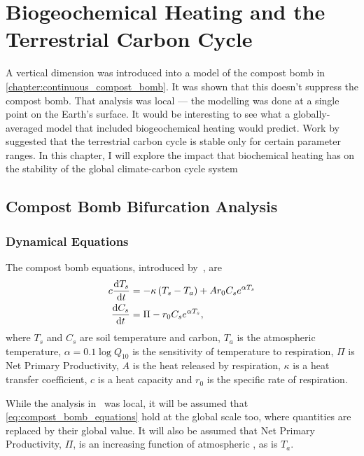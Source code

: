 \chapter{Biogeochemical Heating and the Terrestrial Carbon Cycle}
\label{chapter:global_bomb}
\graphicspath{{global_bomb/figs/}}

\lettrine[lines=3,loversize=0.1,findent=-0.9em,nindent=0.5em,slope=0.6em]{A}{} vertical dimension was introduced into a model of the compost
bomb in \cref{chapter:continuous_compost_bomb}. It was shown that this doesn't
suppress the compost bomb. That analysis was local ---  the modelling was done at a single point on the Earth's surface. It would be interesting to see
what a globally-averaged model that included biogeochemical heating would predict. Work by~\cite{Cox2006} suggested that the terrestrial carbon cycle is stable
only for certain parameter ranges. 
In this chapter, I will explore the impact that biochemical heating has on the stability of the global climate-carbon cycle system
\section{Compost Bomb Bifurcation Analysis}

\subsection{Dynamical Equations}
The compost bomb equations, introduced by~\cite{Luke2011}, are
\begin{subequations}
  \label{eq:compost_bomb_equations}
  \begin{align}
    c \dv{T_s}{t} &= - \kappa \left(T_s - T_a\right) + Ar_0C_se^{\alpha T_s} \label{eq:compost_bomb_soil_temperature} \\
    \dv{C_s}{t} &= \Pi - r_0C_se^{\alpha T_s}, \label{eq:compost_bomb_soil_carbon}
  \end{align}
\end{subequations}
where $T_s$ and $C_s$ are soil temperature and carbon, $T_a$ is the atmospheric temperature, $\alpha = 0.1\log Q_{10}$ is the sensitivity of
temperature to respiration, $\Pi$ is Net Primary Productivity, $A$ is the heat released by respiration, $\kappa$ is a heat transfer coefficient,
$c$ is a heat capacity and $r_0$ is the specific rate of respiration.

While the analysis in~\cite{Luke2011} was local, it will be assumed that \cref{eq:compost_bomb_equations} hold at the global scale too, where quantities are
replaced by their global value. It will also be assumed that Net Primary Productivity, $\Pi$, is an increasing function of atmospheric , as is $T_a$. 

